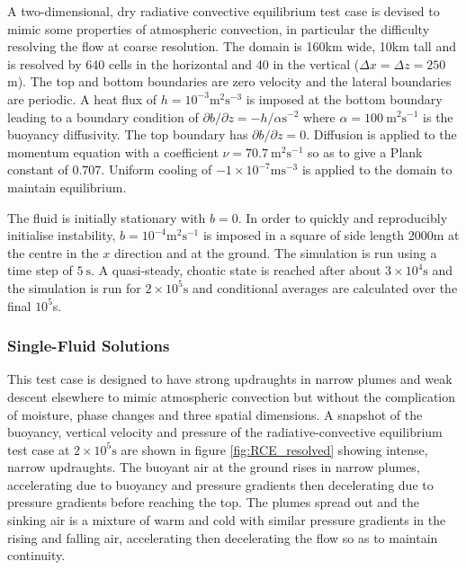 \documentclass[draft]{agujournal2019}
\begin{document}
A two-dimensional, dry radiative convective equilibrium test case
is devised to mimic some properties of atmospheric convection, in
particular the difficulty resolving the flow at coarse resolution.
The domain is 160km wide, 10km tall and is resolved by 640 cells in
the horizontal and 40 in the vertical ($\Delta x=\Delta z=250$m).
The top and bottom boundaries are zero velocity and the lateral boundaries
are periodic. A heat flux of $h=10^{-3}\text{m}^{2}\text{s}^{-3}$
is imposed at the bottom boundary leading to a boundary condition
of $\partial b/\partial z=-h/\alpha\text{s}^{-2}$ where $\alpha=100\ \text{m}^{2}\text{s}^{-1}$
is the buoyancy diffusivity. The top boundary has $\partial b/\partial z=0$.
Diffusion is applied to the momentum equation with a coefficient $\nu=70.7\ \text{m}^{2}\text{s}^{-1}$
so as to give a Plank constant of $0.707$. Uniform cooling of $-1\times10^{-7}\text{m}\text{s}^{-3}$
is applied to the domain to maintain equilibrium.

The fluid is initially stationary with $b=0$. In order to quickly
and reproducibly initialise instability, $b=10^{-4}\text{m}^{2}\text{s}^{-1}$
is imposed in a square of side length 2000m at the centre in the $x$
direction and at the ground. The simulation is run using a time step
of $5\ \text{s}$. A quasi-steady, choatic state is reached after
about $3\times10^{4}\text{s}$ and the simulation is run for $2\times10^{5}\text{s}$
and conditional averages are calculated over the final $10^{5}$s.

\subsubsection{Single-Fluid Solutions}

This test case is designed to have strong updraughts in narrow plumes
and weak descent elsewhere to mimic atmospheric convection but without
the complication of moisture, phase changes and three spatial dimensions.
A snapshot of the buoyancy, vertical velocity and pressure of the
radiative-convective equilibrium test case at $2\times10^{5}\text{s}$
are shown in figure \ref{fig:RCE_resolved} showing intense, narrow
updraughts. The buoyant air at the ground rises in narrow plumes,
accelerating due to buoyancy and pressure gradients then decelerating
due to pressure gradients before reaching the top. The plumes spread
out and the sinking air is a mixture of warm and cold with similar
pressure gradients in the rising and falling air, accelerating then
decelerating the flow so as to maintain continuity. 
\end{document}
